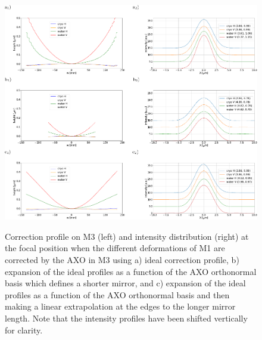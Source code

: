 \documentclass{iucr}
\newcommand{\inblue}[1]{{\color{black}#1}}
\begin{document}
   \begin{figure}
   \label{fig:intensitycorrected} 
   \includegraphics[width=1.0\textwidth]{figures/fig4.pdf}\\
   \caption
   { Correction profile on M3 (left) and intensity distribution (right) at the focal position when the different deformations of M1 are corrected by the AXO in M3 using  a) ideal correction profile, b) expansion of the ideal profiles as a function of the AXO orthonormal basis which defines a shorter mirror, and c) \inblue{expansion of the ideal profiles as a function of the AXO orthonormal basis and then making a linear extrapolation at the edges to the longer mirror length}. Note that the intensity profiles have been shifted vertically for clarity. }
   \end{figure} 
\end{document}
